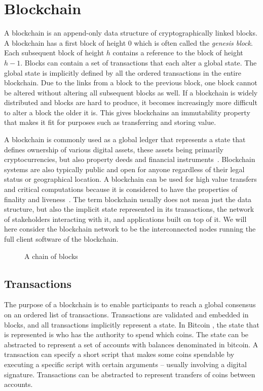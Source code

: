 \section{Blockchain}
\label{sec:blockchain}

A blockchain is an append-only data structure of cryptographically linked blocks. A blockchain has a first block of height $0$ which is often called the \emph{genesis block}. Each subsequent block of height $h$ contains a reference to the block of height $h-1$. Blocks can contain a set of transactions that each alter a global state. The global state is implicitly defined by all the ordered transactions in the entire blockchain. Due to the links from a block to the previous block, one block cannot be altered without altering all subsequent blocks as well. If a blockchain is widely distributed and blocks are hard to produce, it becomes increasingly more difficult to alter a block the older it is. This gives blockchains an immutability property that makes it fit for purposes such as transferring and storing value.

A blockchain is commonly used as a global ledger that represents a state that defines ownership of various digital assets, these assets being primarily cryptocurrencies, but also property deeds and financial instruments~\cite{tschorsch_bitcoin_2016}. Blockchain systems are also typically public and open for anyone regardless of their legal status or geographical location. A blockchain can be used for high value transfers and critical computations because it is considered to have the properties of finality and liveness~\cite{garay_bitcoin_2015}. 
The term blockchain usually does not mean just the data structure, but also the implicit state represented in its transactions, the network of stakeholders interacting with it, and applications built on top of it. We will here consider the blockchain network to be the interconnected nodes running the full client software of the blockchain.

\begin{figure}[htbp]
  \centering
  
  \caption{A chain of blocks}
\end{figure}

\subsection{Transactions}

The purpose of a blockchain is to enable participants to reach a global consensus on an ordered list of transactions. Transactions are validated and embedded in blocks, and all transactions implicitly represent a state. In Bitcoin \cite{bitcoinwhitepaper}, the state that is represented is who has the authority to spend which coins. The state can be abstracted to represent a set of accounts with balances denominated in bitcoin. A transaction can specify a short script that makes some coins spendable by executing a specific script with certain arguments – usually involving a digital signature. Transactions can be abstracted to represent transfers of coins between accounts.

